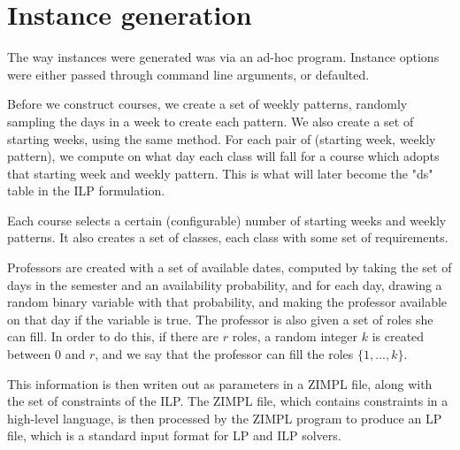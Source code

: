 \chapter{Instance generation}
\label{app:generate}

The way instances were generated was via an ad-hoc program. Instance options were either passed through command line arguments, or defaulted.

Before we construct courses, we create a set of weekly patterns, randomly sampling the days in a week to create each pattern. We also create a set of starting weeks, using the same method. For each pair of (starting week, weekly pattern), we compute on what day each class will fall for a course which adopts that starting week and weekly pattern. This is what will later become the "ds" table in the ILP formulation.

Each course selects a certain (configurable) number of starting weeks and weekly patterns. It also creates a set of classes, each class with some set of requirements.

Professors are created with a set of available dates, computed by taking the set of days in the semester and an availability probability, and for each day, drawing a random binary variable with that probability, and making the professor available on that day if the variable is true. The professor is also given a set of roles she can fill. In order to do this, if there are $r$ roles, a random integer $k$ is created between 0 and $r$, and we say that the professor can fill the roles $\{1, \dots, k\}$.

This information is then writen out as parameters in a ZIMPL\cite{Koch2004} file, along with the set of constraints of the ILP. The ZIMPL file, which contains constraints in a high-level language, is then processed by the ZIMPL program to produce an LP file, which is a standard input format for LP and ILP solvers.
